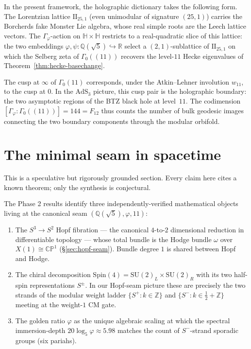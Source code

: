 \documentclass[11pt,a4paper]{article}
\theoremstyle{plain}
\theoremstyle{definition}
\theoremstyle{remark}
\numberwithin{equation}{section}
\providecommand{\R}{\mathbb{R}}
\providecommand{\Qp}{\ensuremath{\mathbb{Q}(\sqrt{5})}}
\providecommand{\Gphi}{\ensuremath{\Gamma_{\varphi}}}
\begin{document}
In the present framework, the holographic dictionary takes the
following form.  The Lorentzian lattice $\mathrm{II}_{25,1}$
(even unimodular of signature $(25,1)$) carries the Borcherds
fake Monster Lie algebra, whose real simple roots are the Leech
lattice vectors.  The $\Gphi$-action on $\mathbb{H}\times\mathbb{H}$
restricts to a real-quadratic slice of this lattice: the two
embeddings $\varphi,\psi\colon\Qp\hookrightarrow\R$ select a
$(2,1)$-sublattice of $\mathrm{II}_{25,1}$ on which the Selberg
zeta of $\Gamma_{0}((11))$ recovers the level-$11$ Hecke eigenvalues
of Theorem~\ref{thm:hecke-basechange}.

The cusp at $\infty$ of $\Gamma_{0}(11)$ corresponds, under the
Atkin--Lehner involution $w_{11}$, to the cusp at $0$.  In the
$\mathrm{AdS}_{3}$ picture, this cusp pair is the holographic
boundary: the two asymptotic regions of the BTZ black hole at
level~$11$.  The codimension $[\Gphi:\Gamma_{0}((11))]=144=F_{12}$
thus counts the number of bulk geodesic images connecting the
two boundary components through the modular orbifold.

\section{The minimal seam in spacetime}
\label{sec:minimal-seam}

This is a speculative but rigorously grounded section.  Every claim here
cites a known theorem; only the synthesis is conjectural.

The Phase 2 results identify three independently-verified mathematical
objects living at the canonical seam $(\Qp,\varphi,11)$:
\begin{enumerate}\setlength{\itemsep}{2pt}
\item[(I)] The $S^{3}\to S^{2}$ Hopf fibration --- the canonical $4$-to-$2$
  dimensional reduction in differentiable topology --- whose total
  bundle is the Hodge bundle $\omega$ over $X(1)\cong\mathbb{CP}^{1}$
  (\S\ref{sec:hopf-seam}).  Bundle degree $1$ is shared between Hopf and Hodge.
\item[(II)] The chiral decomposition
  $\mathrm{Spin}(4) = \mathrm{SU}(2)_{L}\times\mathrm{SU}(2)_{R}$
  with its two half-spin representations $S^{\pm}$.  In our Hopf-seam picture
  these are precisely the two strands of the modular weight ladder
  $\{S^{+}: k\in\mathbb Z\}$ and $\{S^{-}: k\in\tfrac{1}{2}+\mathbb Z\}$
  meeting at the weight-$1$ CM gate.
\item[(III)] The golden ratio $\varphi$ as the unique algebraic scaling at
  which the spectral immersion-depth $20\log_{5}\varphi\approx 5.98$ matches
  the count of $S^{-}$-strand sporadic groups (six pariahs).
\end{enumerate}
\end{document}
